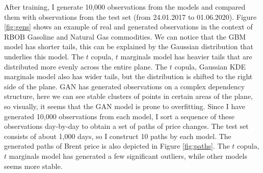 \documentclass{article}
\begin{document}
After training, I generate 10,000 observations from the models and compared them with observations from the test set (from 24.01.2017 to 01.06.2020). Figure \ref{fig:gens} shows an example of real and generated observations in the context of RBOB Gasoline and Natural Gas commodities. We can notice that the GBM model has shorter tails, this can be explained by the Gaussian distribution that underlies this model. The $t$ copula, $t$ marginals model has heavier tails that are distributed more evenly across the entire plane. The $t$ copula, Gaussian KDE marginals model also has wider tails, but the distribution is shifted to the right side of the plane. GAN has generated observations on a complex dependency structure, here we can see stable clusters of points in certain areas of the plane, so visually, it seems that the GAN model is prone to overfitting. Since I have generated 10,000 observations from each model, I sort a sequence of these observations day-by-day to obtain a set of paths of price changes. The test set consists of about 1,000 days, so I construct 10 paths by each model. The generated paths of Brent price is also depicted in Figure \ref{fig:paths}. The $t$ copula, $t$ marginals model has generated a few significant outliers, while other models seems more stable.
\end{document}
